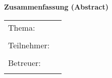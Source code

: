 \begin{center}
{\Large \textbf{Zusammenfassung (Abstract)}}
\end{center}

\bigskip

\begin{center}
	\begin{tabular}{p{2.8cm}p{10cm}}
		Thema: & \thema \\
		 & \\
		Teilnehmer: & \autor \\
		 & \\
		Betreuer: & \prueferA  \\
		 & \\
	\end{tabular}
\end{center}

\bigskip

\noindent
\zusammenfassung